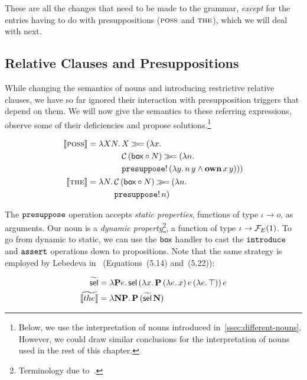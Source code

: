 These are all the changes that need to be made to the grammar,
\emph{except} for the entries having to do with presuppositions
($\textsc{poss}$ and $\textsc{the}$), which we will deal with next.


\subsection{Relative Clauses and Presuppositions}
\label{ssec:relative-clauses-presuppositions}

While changing the semantics of nouns and introducing restrictive relative
clauses, we have so far ignored their interaction with presupposition
triggers that depend on them. We will now give the semantics to these
referring expressions, observe some of their deficiencies and propose
solutions.\footnote{Below, we use the interpretation of nouns introduced
  in~\ref{ssec:different-nouns}. However, we could draw similar conclusions
  for the interpretation of nouns used in the rest of this chapter.}

\begin{align*}
  \llbracket \textsc{poss} \rrbracket &= \lambda X N.\, \begin{aligned}[t]
      &X \mathbin{\gg\!=} (\lambda x.\,  \\
      &\mathcal{C}\,(\textsf{box} \circ N) \mathbin{\gg\!=} (\lambda n.\,  \\
      &\mathtt{presuppose}!\,(\lambda y.\, n\,y \land \textbf{own}\,x\,y)))
    \end{aligned} \\
  \llbracket \textsc{the} \rrbracket &= \lambda N.\, \begin{aligned}[t]
      &\mathcal{C}\,(\textsf{box} \circ N) \mathbin{\gg\!=} (\lambda n.\,  \\
      &\mathtt{presuppose}!\,n)
    \end{aligned}
\end{align*}

The $\mathtt{presuppose}$ operation accepts \emph{static properties}, functions
of type $\iota \to o$, as arguments. Our noun is a \emph{dynamic
  property}\footnote{Terminology due to~\cite{lebedeva2012expression}.}, a
function of type $\iota \to \mathcal{F}_E(1)$. To go from dynamic to static, we can
use the $\textsf{box}$ handler to cast the $\mathtt{introduce}$ and $\mathtt{assert}$
operations down to propositions. Note that the same strategy is employed by
Lebedeva in~\cite{lebedeva2012expression} (Equations~(5.14) and~(5.22)):

\begin{align*}
  \widetilde{\textsf{sel}} &= \lambda \textbf{P} e.\, \textsf{sel}\,(\lambda x.\, \textbf{P}\,(\lambda e.\, x)\,e\,(\lambda e.\, \top))\,e \\
  \widetilde{\llbracket the \rrbracket} &= \lambda \textbf{N} \textbf{P}.\, \textbf{P}\,(\widetilde{\textsf{sel}}\,\textbf{N})
\end{align*}

